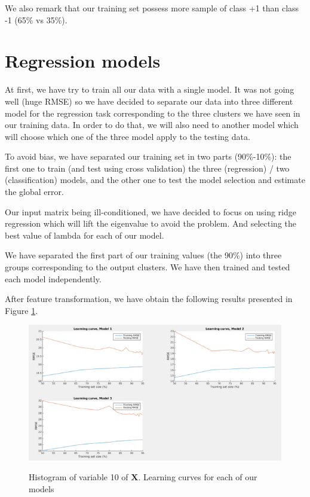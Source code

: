 \documentclass{article} %
\begin{document}
We also remark that our training set possess more sample of class +1 than class -1 (65\% vs 35\%).

\section{Regression models}
At first, we have try to train all our data with a single model. It was not going well (huge RMSE) so we have decided to separate our data into three different model for the regression task corresponding to the three clusters we have seen in our training data. In order to do that, we will also need to another model which will choose which one of the three model apply to the testing data.

To avoid bias, we have separated our training set in two parts (90\%-10\%): the first one to train (and test using cross validation) the three (regression) / two (classification) models, and the other one to test the model selection and estimate the global error.

Our input matrix being ill-conditioned, we have decided to focus on using ridge regression which will lift the eigenvalue to avoid the problem. And selecting the best value of lambda for each of our model.

We have separated the first part of our training values (the 90\%) into three groups corresponding to the output clusters. We have then trained and tested each model independently.

After feature transformation, we have obtain the following results presented in Figure \ref{fig:learningCurves}.

\begin{figure}[!h]
\center
{\includegraphics{figures/learningCurves.png} \label{fig:learningCurves}}
\caption{Histogram of variable 10 of $\mathbf{X}$. Learning curves for each of our models}
\end{figure}
\end{document}

